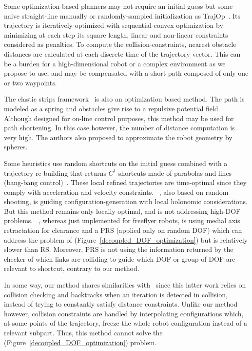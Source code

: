 \documentclass{tADR2e}
\begin{document}
Some optimization-based planners may not require an initial guess but some naive 
straight-line manually or randomly-sampled initialization as 
TrajOp~\cite{SchulmanConvexOptim}. Its trajectory is iteratively optimized with 
sequential convex optimization by minimizing at each step its square length, 
linear and non-linear constraints considered as penalties. To compute the 
collision-constraints, nearest obstacle distances are calculated at each discrete 
time of the trajectory vector. This can be a burden for a high-dimensional robot 
or a complex environment as we propose to use, and may be compensated with a 
short path composed of only one or two waypoints.


The elastic strips framework~\cite{BrockElasticStrips} is also an optimization 
based method. The path is modeled as a spring and obstacles give rise to a 
repulsive potential field. Although designed for on-line control purposes, this 
method may be used for path shortening. In this case however, the number of 
distance computation is very high. The authors also proposed to approximate the 
robot geometry by spheres.

Some heuristics use random shortcuts on the initial guess combined with a 
trajectory re-building that returns ${C}^1$ shortcuts made of parabolas and lines 
(bang-bang control)~\cite{HauserFastSmooth}. These local refined trajectories 
are time-optimal since they comply with acceleration and velocity constraints. 
~\cite{Guernane2011}, also based on random shooting, is guiding 
configuration-generation with local holonomic considerations. 
But this method remains only 
locally optimal, and is not addressing high-DOF problems.
~\cite{Geraerts04clearancebased}, whereas just implemented for freeflyer robots, is 
using medial axis retractation for clearance and a PRS (applied only on random DOF) 
which can address the problem of (Figure~\ref{decoupled_DOF_optimization}) but is 
relatively slower than RS. Moreover, PRS is not using the information returned by 
the checker of which links are colliding to guide which DOF or group of DOF are 
relevant to shortcut, contrary to our method.

In some way, our method shares similarities with~\cite{PanSmoothSplineShort} 
since this latter work relies on collision checking and backtracks when an 
iteration is detected in collision, instead of trying to constantly satisfy 
distance constraints. Unlike our method however, collision constraints are 
handled by interpolating configurations which, at some points of the trajectory, 
freeze the whole robot configuration instead of a relevant subpart. Thus, this 
method cannot solve the (Figure~\ref{decoupled_DOF_optimization}) problem.
\end{document}
